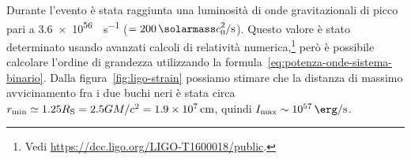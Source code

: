 Durante l'evento è stata raggiunta una luminosità di onde gravitazionali di
picco pari a \SI{3.6e56}{\erg\per\second}
(\(=\SI{200}{\solarmass\clight\squared\per\second}\)).  Questo valore è stato
determinato usando avanzati calcoli di relatività numerica,\footnote{Vedi
  \url{https://dcc.ligo.org/LIGO-T1600018/public}.} però è possibile calcolare
l'ordine di grandezza utilizzando la
formula~\eqref{eq:potenza-onde-sistema-binario}.  Dalla
figura~\ref{fig:ligo-strain} possiamo stimare che la distanza di massimo
avvicinamento fra i due buchi neri è stata circa
\(r_{\textup{min}} \simeq 1.25 R_{\textup{S}} = 2.5 GM/c^{2} =
\SI{1.9e7}{\centi\metre}\), quindi
\(I_{\textup{max}} \sim \SI{e57}{\erg\per\second}\).

